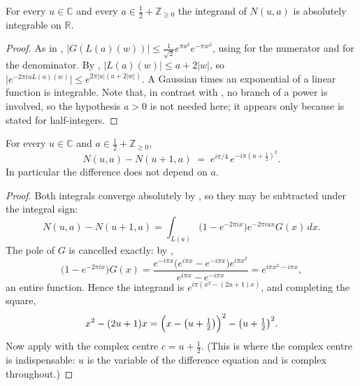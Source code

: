 \begin{lemma}[Convergence]
\label{lem:rsz_mordell_conv}
\leanok
{}
For every $u\in\mathbb{C}$ and every $a\in\tfrac12+\mathbb{Z}_{\ge0}$ the integrand of
$N(u,a)$ is absolutely integrable on $\mathbb{R}$.
\end{lemma}

\begin{proof}
\leanok
{}
As in , $\lvert G(L(a)(w))\rvert\le\tfrac1{\sqrt2}e^{\pi a^{2}}
e^{-\pi w^{2}}$, using  for the numerator and
 for the denominator.  By ,
$\lvert L(a)(w)\rvert\le a+2\lvert w\rvert$, so
$\lvert e^{-2\pi iuL(a)(w)}\rvert\le e^{2\pi\lvert u\rvert(a+2\lvert w\rvert)}$.  A Gaussian
times an exponential of a linear function is integrable.  Note that, in contrast with
, no branch of a power is involved, so the hypothesis $a>0$ is not
needed here; it appears only because  is stated for half-integers.
\end{proof}

\begin{lemma}
\label{lem:rsz_mordell_gauss}
\leanok
{}
For every $u\in\mathbb{C}$ and $a\in\tfrac12+\mathbb{Z}_{\ge0}$,
\[
  N(u,a)-N(u+1,a)\;=\;e^{i\pi/4}\,e^{-i\pi\left(u+\frac12\right)^{2}} .
\]
In particular the difference does not depend on $a$.
\end{lemma}

\begin{proof}
\leanok
{}
Both integrals converge absolutely by , so they may be
subtracted under the integral sign:
\[
  N(u,a)-N(u+1,a)=\int_{L(a)}\bigl(1-e^{-2\pi ix}\bigr)e^{-2\pi iux}G(x)\,dx .
\]
The pole of $G$ is cancelled exactly: by ,
\[
  \bigl(1-e^{-2\pi ix}\bigr)G(x)
  =\frac{e^{-i\pi x}\bigl(e^{i\pi x}-e^{-i\pi x}\bigr)e^{i\pi x^{2}}}
        {e^{i\pi x}-e^{-i\pi x}}
  =e^{i\pi x^{2}-i\pi x},
\]
an entire function.  Hence the integrand is $e^{i\pi(x^{2}-(2u+1)x)}$, and completing the
square,
\[
  x^{2}-(2u+1)x=\Bigl(x-\bigl(u+\tfrac12\bigr)\Bigr)^{2}-\bigl(u+\tfrac12\bigr)^{2}.
\]
Now apply  with the complex centre $c=u+\tfrac12$.  (This is
where the complex centre is indispensable: $u$ is the variable of the difference equation
and is complex throughout.)
\end{proof}

